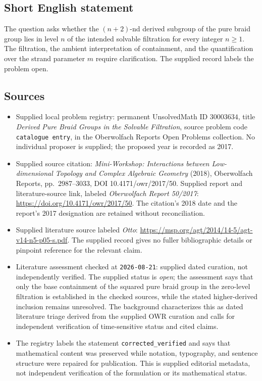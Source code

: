 \documentclass[11pt]{article}
\begin{document}
\subsection{Short English statement}
The question asks whether the \((n+2)\)-nd derived subgroup of the pure braid group lies in level \(n\) of the intended solvable filtration for every integer \(n\geq1\). The filtration, the ambient interpretation of containment, and the quantification over the strand parameter \(m\) require clarification. The supplied record labels the problem open.
\subsection{Sources}
\begin{itemize}
\item Supplied local problem registry: permanent UnsolvedMath ID \(30003634\), title \emph{Derived Pure Braid Groups in the Solvable Filtration}, source problem code \texttt{catalogue entry}, in the Oberwolfach Reports Open Problems collection. No individual proposer is supplied; the proposed year is recorded as 2017.
\item Supplied source citation: \emph{Mini-Workshop: Interactions between Low-dimensional Topology and Complex Algebraic Geometry} (2018), Oberwolfach Reports, pp.\ 2987--3033, DOI 10.4171/owr/2017/50. Supplied report and literature-source link, labeled \emph{Oberwolfach Report 50/2017}: \url{https://doi.org/10.4171/owr/2017/50}. The citation's 2018 date and the report's 2017 designation are retained without reconciliation.
\item Supplied literature source labeled \emph{Otto}: \url{https://msp.org/agt/2014/14-5/agt-v14-n5-p05-s.pdf}. The supplied record gives no fuller bibliographic details or pinpoint reference for the relevant claim.
\item Literature assessment checked at \texttt{2026-08-21}: supplied dated curation, not independently verified. The supplied status is \emph{open}; the assessment says that only the base containment of the squared pure braid group in the zero-level filtration is established in the checked sources, while the stated higher-derived inclusion remains unresolved. The background characterizes this as dated literature triage derived from the supplied OWR curation and calls for independent verification of time-sensitive status and cited claims.
\item The registry labels the statement \texttt{corrected\_verified} and says that mathematical content was preserved while notation, typography, and sentence structure were repaired for publication. This is supplied editorial metadata, not independent verification of the formulation or its mathematical status.
\end{itemize}
\end{document}
